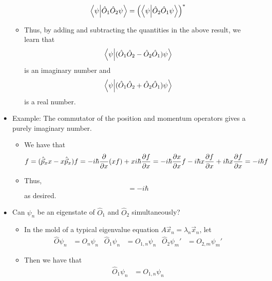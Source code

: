 \documentclass[../notes.tex]{subfiles}
\begin{document}
\begin{itemize}
\begin{itemize}
        \begin{equation*}
            \braket{\psi}{\hat{O}_1\hat{O}_2\psi} = \left( \braket{\psi}{\hat{O}_2\hat{O}_1\psi} \right)^*
        \end{equation*}
        \item Thus, by adding and subtracting the quantities in the above result, we learn that
        \begin{equation*}
            \braket{\psi}{(\hat{O}_1\hat{O}_2-\hat{O}_2\hat{O}_1)\psi}
        \end{equation*}
        is an imaginary number and
        \begin{equation*}
            \braket{\psi}{(\hat{O}_1\hat{O}_2+\hat{O}_2\hat{O}_1)\psi}
        \end{equation*}
        is a real number.
    \end{itemize}
    \item Example: The commutator of the position and momentum operators gives a purely imaginary number.
    \begin{itemize}
        \item We have that
        \begin{equation*}
            [\hat{\vec{p}}_x,\hat{x}]f = (\hat{\vec{p}}_xx-x\hat{\vec{p}}_x)f
            = -i\hbar\pdv{x}(xf)+xi\hbar\pdv{f}{x}
            = -i\hbar\pdv{x}{x}f-i\hbar x\pdv{f}{x}+i\hbar x\pdv{f}{x}
            = -i\hbar f
        \end{equation*}
        \item Thus,
        \begin{equation*}
            [\hat{\vec{p}}_x,\hat{x}] = -i\hbar
        \end{equation*}
        as desired.
    \end{itemize}
    \item Can $\psi_n$ be an eigenstate of $\hat{O}_1$ and $\hat{O}_2$ simultaneously?
    \begin{itemize}
        \item In the mold of a typical eigenvalue equation $A\vec{x}_n=\lambda_n\vec{x}_n$, let
        \begin{align*}
            \hat{O}\psi_n &= O_n\psi_n&
            \hat{O}_1\psi_n &= O_{1,n}\psi_n&
            \hat{O}_2\psi_m' &= O_{2,m}\psi_m'
        \end{align*}
        \item Then we have that
        \begin{align*}
            \hat{O}_1\psi_n &= O_{1,n}\psi_n\\

\end{align*}
\end{itemize}
\end{itemize}
\end{document}
